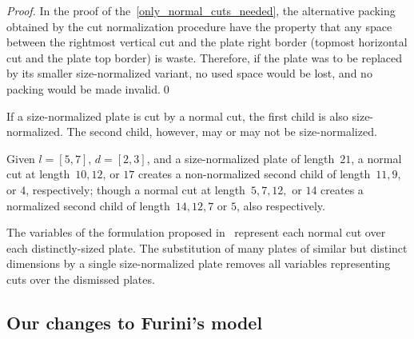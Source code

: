 \documentclass[runningheads]{llncs}
\begin{document}
\begin{proof}
In the proof of the~\autoref{only_normal_cuts_needed}, the alternative packing obtained by the cut normalization procedure have the property that any space between the rightmost vertical cut and the plate right border (topmost horizontal cut and the plate top border) is waste. Therefore, if the plate was to be replaced by its smaller size-normalized variant, no used space would be lost, and no packing would be made invalid.\qed
\end{proof}

\begin{remark}
If a size-normalized plate is cut by a normal cut, the first child is also size-normalized. The second child, however, may or may not be size-normalized.
\end{remark}


\begin{example}
Given \(l = [5, 7]\), \(d = [2, 3]\), and a size-normalized plate of length~\(21\), a normal cut at length~\(10, 12\), or \(17\) creates a non-normalized second child of length~\(11, 9\), or \(4\), respectively; though a normal cut at length~\(5, 7, 12,\) or \(14\) creates a normalized second child of length~\(14, 12, 7\) or \(5\), also respectively.
\end{example}

The variables of the formulation proposed in~\cite{furini:2016} represent each normal cut over each distinctly-sized plate.
The substitution of many plates of similar but distinct dimensions by a single size-normalized plate removes all variables representing cuts over the dismissed plates.

\subsection{Our changes to Furini's model}

% 
\end{document}
